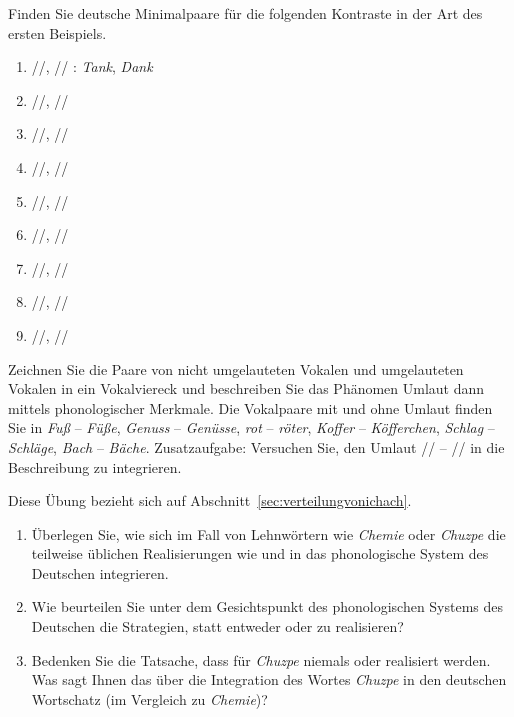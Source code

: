 \Uebungen

\Uebung \label{u41} Finden Sie deutsche Minimalpaare für die folgenden Kontraste in der Art des ersten Beispiels.

\begin{enumerate}\Lf
  \item{//, // : \textit{Tank}, \textit{Dank}}
  \item{//, //}
  \item{//, //}
  \item{//, //}
  \item{//, //}
  \item{//, //}
  \item{//, //}
  \item{//, //}
  \item{//, //}
\end{enumerate}

\Uebung \label{u42} Zeichnen Sie die Paare von nicht umgelauteten Vokalen und umgelauteten Vokalen in ein Vokalviereck und beschreiben Sie das Phänomen Umlaut dann mittels phonologischer Merkmale.
Die Vokalpaare mit und ohne Umlaut finden Sie in \textit{Fuß} -- \textit{Füße}, \textit{Genuss} -- \textit{Genüsse}, \textit{rot} -- \textit{röter}, \textit{Koffer} -- \textit{Köfferchen}, \textit{Schlag} -- \textit{Schläge}, \textit{Bach} -- \textit{Bäche}.
Zusatzaufgabe: Versuchen Sie, den Umlaut // -- // in die Beschreibung zu integrieren.

\Uebung[\tristar] \label{u43} Diese Übung bezieht sich auf Abschnitt~\ref{sec:verteilungvonichach}.

\begin{enumerate}\Lf
  \item Überlegen Sie, wie sich im Fall von Lehnwörtern wie \textit{Chemie} oder \textit{Chuzpe} die teilweise üblichen Realisierungen wie \textipa{[\c{c}emi:]} und \textipa{[XU\t{ts}p@]} in das phonologische System des Deutschen integrieren.
  \item Wie beurteilen Sie unter dem Gesichtspunkt des phonologischen Systems des Deutschen die Strategien, statt \textipa{[\c{c}emi:]} entweder \textipa{[Semi:]} oder \textipa{[kemi:]} zu realisieren?
  \item Bedenken Sie die Tatsache, dass für \textit{Chuzpe} niemals \textipa{[SU\t{ts}p@]} oder \textipa{[kU\t{ts}p@]} realisiert werden.
    Was sagt Ihnen das über die Integration des Wortes \textit{Chuzpe} in den deutschen Wortschatz (im Vergleich zu \textit{Chemie})?
\end{enumerate}

